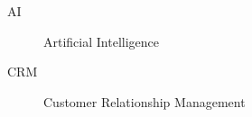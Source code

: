 \begin{description}
    \item[AI] Artificial Intelligence
    \item[CRM] Customer Relationship Management
\end{description}
\newpage